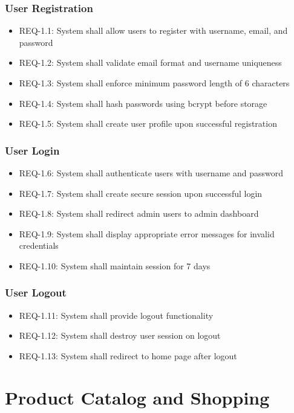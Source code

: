 \documentclass{scrreprt}
\begin{document}
\subsubsection{User Registration}
\begin{itemize}
\item REQ-1.1: System shall allow users to register with username, email, and password
\item REQ-1.2: System shall validate email format and username uniqueness
\item REQ-1.3: System shall enforce minimum password length of 6 characters
\item REQ-1.4: System shall hash passwords using bcrypt before storage
\item REQ-1.5: System shall create user profile upon successful registration
\end{itemize}

\subsubsection{User Login}
\begin{itemize}
\item REQ-1.6: System shall authenticate users with username and password
\item REQ-1.7: System shall create secure session upon successful login
\item REQ-1.8: System shall redirect admin users to admin dashboard
\item REQ-1.9: System shall display appropriate error messages for invalid credentials
\item REQ-1.10: System shall maintain session for 7 days
\end{itemize}

\subsubsection{User Logout}
\begin{itemize}
\item REQ-1.11: System shall provide logout functionality
\item REQ-1.12: System shall destroy user session on logout
\item REQ-1.13: System shall redirect to home page after logout
\end{itemize}

\section{Product Catalog and Shopping}
\end{document}

